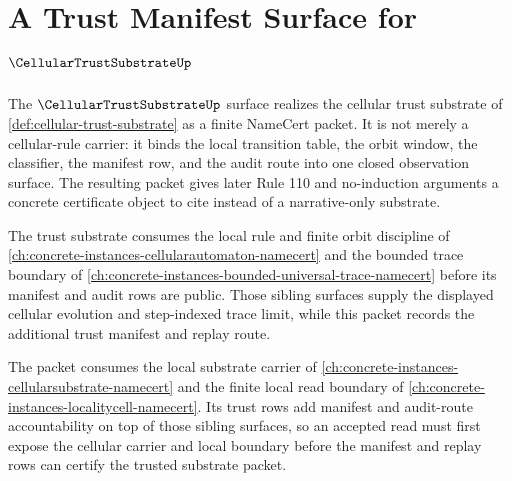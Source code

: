 \chapter{A Trust Manifest Surface for $\CellularTrustSubstrateUp$}
\label{ch:concrete-instances-cellular-trust-substrate-namecert}

The $\CellularTrustSubstrateUp$ surface realizes the cellular trust substrate of \autoref{def:cellular-trust-substrate} as a finite NameCert packet. It is not merely a cellular-rule carrier: it binds the local transition table, the orbit window, the classifier, the manifest row, and the audit route into one closed observation surface. The resulting packet gives later Rule 110 and no-induction arguments a concrete certificate object to cite instead of a narrative-only substrate.

The trust substrate consumes the local rule and finite orbit discipline of \autoref{ch:concrete-instances-cellularautomaton-namecert} and the bounded trace boundary of \autoref{ch:concrete-instances-bounded-universal-trace-namecert} before its manifest and audit rows are public. Those sibling surfaces supply the displayed cellular evolution and step-indexed trace limit, while this packet records the additional trust manifest and replay route.

The packet consumes the local substrate carrier of \autoref{ch:concrete-instances-cellularsubstrate-namecert} and the finite local read boundary of \autoref{ch:concrete-instances-localitycell-namecert}. Its trust rows add manifest and audit-route accountability on top of those sibling surfaces, so an accepted read must first expose the cellular carrier and local boundary before the manifest and replay rows can certify the trusted substrate packet.



